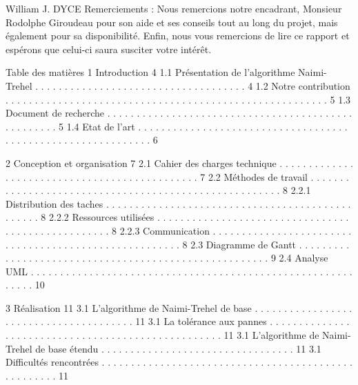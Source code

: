 \documentclass[a4paper,french,towsides,10pt]{book}
\begin{document}
William J. DYCE                                                                
Remerciements :
Nous remercions notre encadrant,  Monsieur Rodolphe Giroudeau pour son aide et ses conseils tout au long du projet, mais également pour sa disponibilité.
Enfin, nous vous remercions de lire ce rapport et espérons que celui-ci saura susciter votre intérêt.



Table des matières
1 Introduction                                                                                                                                       4
  1.1 Présentation de l’algorithme Naimi-Trehel . . . . . . . . . . . . . . . . . . . . . . . . . . . . . . . . . . . . 4
  1.2 Notre contribution  . . . . . . . . . . . . . . . . . . . . . . . . . . . .  . . . . . . . . . . . . . . . . . . . . . . . . . . . 5
  1.3 Document de recherche . . . . . . . . . . . . . . . . . . . . . . . . .  . . . . . . . . . . . . . . . . . . . . . . . . . . 5
  1.4 Etat de l’art  . . . . . . . . . . . . . . . . . . . . . . . . . . . . . . .  . . . . . . . . . . . . . . . . . . . . . . . . . . . . . . 6

2 Conception et organisation                                                                                                          7
  2.1 Cahier des charges technique  . . . . . . . . . . . . . . . . . . . . . . . .  . . . . . . . . . . . . . . . . . . . . . . 7
  2.2 Méthodes de travail  . . . . . . . . . . . . . . . . . . . . . . . . . . .  . . . . . . . . . . . . . . . . . . . . . . . . . . . 8
      2.2.1 Distribution des taches  . . . . . . . . . . . . . . . . . . . . . . . . .  . . . . . . . . . . . . . . . . . . . . . . . 8
      2.2.2 Ressources utilisées  . . . . . . . . . . . . . . . . . . . . . . . . . . . . . . . . . . . . . . . . . . . . . . . . . . . 8
      2.2.3 Communication  . . . . . . . . . . . . . . . . . . . . . . . . . .  . . . . . . . . . . . . . . . . . . . . . . . . . . . . 8
  2.3 Diagramme de Gantt . . . . . . . . . . . . . . . . . . . . . . . . . . . . . . . . . . . . . . . . . . . . . . . . . . . . . . 9
  2.4 Analyse UML . . . . . . . . . . . . . . . . . . . . . . . . . . . . .  . . . . . . . . . . . . . . . . . . . . . . . . . . . . . . . 10

3 Réalisation                                                                                                                                         11
3.1 L’algorithme de Naimi-Trehel de base  . . . . . . . . . . . . . . . . . . . . . . . . . . . . . . . . . . . . . . . 11
3.1 La tolérance aux pannes . . . . . . . . . . . . . . . . . . . . . . . . . . . . . . . . . . . . . . . . . . . . . . . . . . . 11
3.1 L’algorithme de Naimi-Trehel de base étendu . . . . . . . . . . . . . . . . . . . . . . . . . . . . . . . . . 11
3.1 Difficultés rencontrées . . . . . . . . . . . . . . . . . . . . . . . . . . . . . . . . . . . . . . . . . . . . . . . . . . . . 11
\end{document}

